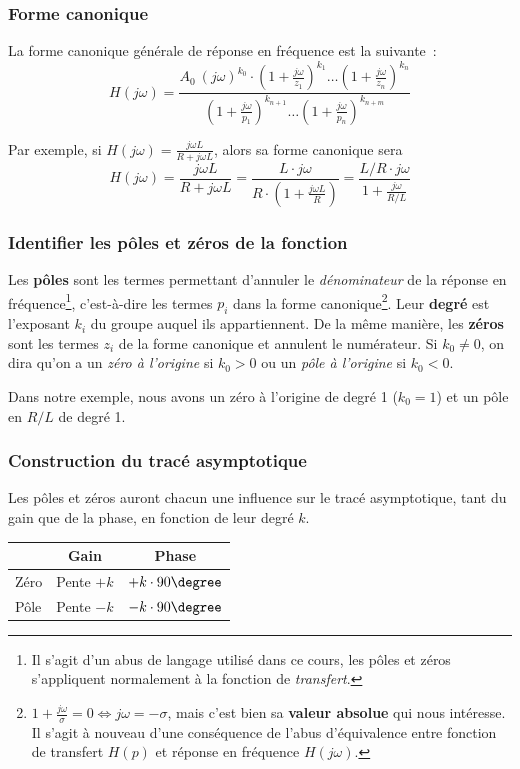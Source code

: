 \subsubsection{Forme canonique}
La forme canonique générale de réponse en fréquence est la suivante~:
\[H(j\omega) = \frac{ A_0\ (j\omega)^{k_0} \cdot \left(1 + \frac{j\omega}{z_1} \right)^{k_1} \dots \left(1 + \frac{j\omega}{z_n} \right)^{k_n} }{\left(1 + \frac{j\omega}{p_1} \right)^{k_{n+1}} \dots \left(1 + \frac{j\omega}{p_n} \right)^{k_{n+m}}}\]

Par exemple, si $H(j\omega) = \frac{j\omega L}{R + j\omega L}$, alors sa forme canonique sera 
\[H(j\omega) = \frac{j\omega L}{R + j\omega L} = \frac{L \cdot j\omega}{R\cdot \left(1 + \frac{j\omega L}{R}\right)} = \frac{L/R \cdot j\omega}{1 + \frac{j\omega}{R/L}}\]


\subsubsection{Identifier les pôles et zéros de la fonction}
Les \textbf{pôles} sont les termes permettant d'annuler le \textit{dénominateur} de la réponse en fréquence\footnote{Il s'agit d'un abus de langage utilisé dans ce cours, les pôles et zéros s'appliquent normalement à la fonction de \textit{transfert}.}, c'est-à-dire les termes $p_i$ dans la forme canonique\footnote{$1 + \frac{j\omega}{\sigma} = 0 \Leftrightarrow j\omega = -\sigma$, mais c'est bien sa \textbf{valeur absolue} qui nous intéresse. Il s'agit à nouveau d'une conséquence de l'abus d'équivalence entre fonction de transfert $H(p)$ et réponse en fréquence $H(j\omega)$.}.
Leur \textbf{degré} est l'exposant $k_i$ du groupe auquel ils appartiennent.
De la même manière, les \textbf{zéros} sont les termes $z_i$ de la forme canonique et annulent le numérateur.
Si $k_0 \neq 0$, on dira qu'on a un \textit{zéro à l'origine} si $k_0 > 0$ ou un \textit{pôle à l'origine} si $k_0 < 0$.

Dans notre exemple, nous avons un zéro à l'origine de degré 1 ($k_0 = 1$) et un pôle en $R/L$ de degré 1.

\subsubsection{Construction du tracé asymptotique}
Les pôles et zéros auront chacun une influence sur le tracé asymptotique, tant du gain que de la phase, en fonction de leur degré $k$.

\begin{center}\renewcommand{\arraystretch}{1.3}
\begin{tabular}{lcc}
& Gain & Phase \\ \hline
Zéro & Pente $+k$ & $+k\cdot90\degree$ \\
Pôle & Pente $-k$ & $-k\cdot90\degree$
\end{tabular}
\end{center}

